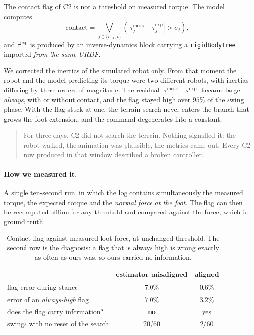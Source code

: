 \documentclass[11pt,a4paper]{article}
\newcommand{\Ct}{\textsf{C2}}
\begin{document}
The contact flag of \Ct{} is not a threshold on measured torque. The model
computes
\begin{equation}
\mathrm{contact} = \bigvee_{j\in\{c,f,t\}}
\left( \left| \tau_j^{\mathrm{meas}} - \tau_j^{\mathrm{exp}} \right| > \sigma_j \right),
\label{eq:flag}
\end{equation}
and $\tau^{\mathrm{exp}}$ is produced by an inverse-dynamics block carrying a
\texttt{rigidBodyTree} imported \emph{from the same URDF}.

We corrected the inertias of the simulated robot only. From that moment the
robot and the model predicting its torque were two different robots, with
inertias differing by three orders of magnitude. The residual
$|\tau^{\mathrm{meas}} - \tau^{\mathrm{exp}}|$ became large \emph{always},
with or without contact, and the flag stayed high over $95\%$ of the swing
phase. With the flag stuck at one, the terrain search never enters the branch
that grows the foot extension, and the command degenerates into a constant.

\begin{quote}
For three days, \Ct{} did not search the terrain. Nothing signalled it: the
robot walked, the animation was plausible, the metrics came out. Every \Ct{}
row produced in that window described a broken controller.
\end{quote}

\paragraph{How we measured it.} A single ten-second run, in which the log
contains simultaneously the measured torque, the expected torque and the
\emph{normal force at the foot}. The flag can then be recomputed offline for
any threshold and compared against the force, which is ground truth.

\begin{table}[htbp]
\centering
\caption{Contact flag against measured foot force, at unchanged threshold.
The second row is the diagnosis: a flag that is always high is wrong exactly
as often as ours was, so ours carried no information.}
\label{tab:estimator}
\small
\begin{tabular}{@{}lcc@{}}
\toprule
 & \textbf{estimator misaligned} & \textbf{aligned} \\
\midrule
flag error during stance                & $7.0\%$ & $\mathbf{0.6\%}$ \\
error of an \emph{always-high} flag     & $7.0\%$ & $3.2\%$ \\
does the flag carry information?        & \textbf{no} & yes \\
swings with no reset of the search      & $20/60$ & $2/60$ \\
\bottomrule
\end{tabular}
\end{table}
\end{document}
